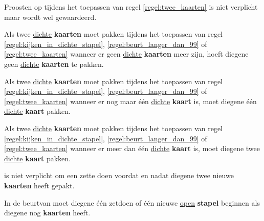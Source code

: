 \vervolgLijst{}
\item Proosten op  tijdens het toepassen van regel \ref{regel:twee_kaarten} is niet verplicht maar wordt wel gewaardeerd.
\eindLijst{}

\vervolgLijst{}
\item Als \eenSpeler twee \ul{dichte} \textbf{kaarten} moet pakken tijdens het toepassen van regel \ref{regel:kijken_in_dichte_stapel}, \ref{regel:beurt_langer_dan_99} of \ref{regel:twee_kaarten} wanneer er geen \ul{dichte} \textbf{kaarten} meer zijn, hoeft diegene geen \ul{dichte} \textbf{kaarten} te pakken.
\label{item:geen_kaart_1}
\eindLijst{}

\vervolgLijst{}
\item Als \eenSpeler twee \ul{dichte} \textbf{kaarten} moet pakken tijdens het toepassen van regel \ref{regel:kijken_in_dichte_stapel}, \ref{regel:beurt_langer_dan_99} of \ref{regel:twee_kaarten} wanneer er nog maar \'e\'en \ul{dichte} \textbf{kaart} is, moet diegene \'e\'en \ul{dichte} \textbf{kaart} pakken.
\label{item:geen_kaart_2}
\eindLijst{}

\vervolgLijst{}
\item Als \eenSpeler twee \ul{dichte} \textbf{kaarten} moet pakken tijdens het toepassen van regel \ref{regel:kijken_in_dichte_stapel}, \ref{regel:beurt_langer_dan_99} of \ref{regel:twee_kaarten} wanneer er meer dan \'e\'en \ul{dichte} \textbf{kaart} is, moet diegene twee \ul{dichte} \textbf{kaart} pakken.
\label{item:geen_kaart_3}
\eindLijst{}

\vervolgLijst{}
\item \EenSpeler is niet verplicht om een zet\footnotemark[3] te doen voordat en nadat diegene twee nieuwe \textbf{kaarten} heeft gepakt.
\eindLijst{}

\vervolgLijst{}
\item In de beurt\footnotemark[1] van \eenSpeler moet diegene \'e\'en zet\footnotemark[3] doen of \'e\'en nieuwe \ul{open} \textbf{stapel} beginnen als diegene nog \textbf{kaarten} heeft.
\eindLijst{}

\footnotetext[2]{\footnoteFritsjeDesNemen}

\newpage
{}

